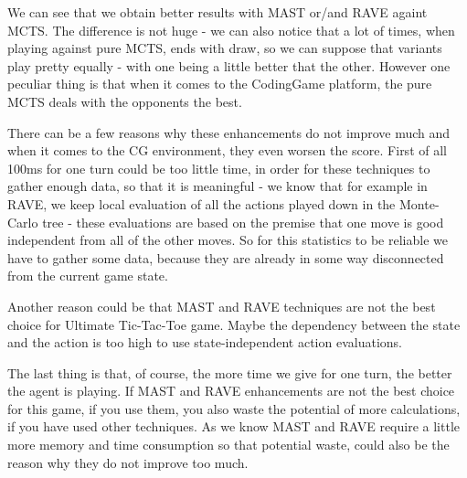 \documentclass[11pt]{article}
\begin{document}
	We can see that we obtain better results with MAST or/and RAVE againt MCTS. The difference is not huge - we can also notice that a lot of times, when playing against pure MCTS, ends with draw, so we can suppose that variants play pretty equally - with one being a little better that the other. However one peculiar thing is that when it comes to the CodingGame platform, the pure MCTS deals with the opponents the best.
	
	There can be a few reasons why these enhancements do not improve much and when it comes to the CG environment, they even worsen the score. First of all 100ms for one turn could be too little time, in order for these techniques to gather enough data, so that it is meaningful - we know that for example in RAVE, we keep local evaluation of all the actions played down in the Monte-Carlo tree - these evaluations are based on the premise that one move is good independent from all of the other moves. So for this statistics to be reliable we have to gather some data, because they are already in some way disconnected from the current game state.
	
	Another reason could be that MAST and RAVE techniques are not the best choice for Ultimate Tic-Tac-Toe game. Maybe the dependency between the state and the action is too high to use state-independent action evaluations.
	
	The last thing is that, of course, the more time we give for one turn, the better the agent is playing. If MAST and RAVE enhancements are not the best choice for this game, if you use them, you also waste the potential of more calculations, if you have used other techniques. As we know MAST and RAVE require a little more memory and time consumption so that potential waste, could also be the reason why they do not improve too much.
	
\end{document}
